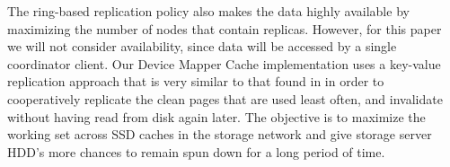 The ring-based replication policy also makes the data highly available by
maximizing the number of nodes that contain replicas. However, for this paper we
will not consider availability, since data will be accessed by a single
coordinator client. Our Device Mapper Cache implementation uses a key-value
replication approach that is very similar to that found in \cite{chord} in order
to cooperatively replicate the clean pages that are used least often, and
invalidate without having read from disk again later. The objective is to
maximize the working set across SSD caches in the storage network and give
storage server HDD's more chances to remain spun down for a long period of time.
